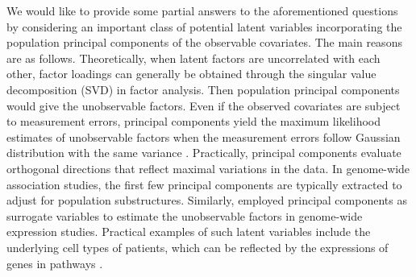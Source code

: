 \documentclass{statsoc}
\begin{document}

We would like to provide some partial answers to the aforementioned questions by considering an important class of potential latent variables incorporating the population principal components of the observable covariates. The main reasons are as follows. Theoretically, when latent factors are uncorrelated with each other, factor loadings can generally be obtained through the singular value decomposition (SVD) in factor analysis. Then population principal components would give the unobservable factors. Even if the observed covariates are subject to measurement errors, principal components yield the maximum likelihood estimates of unobservable factors when the measurement errors follow Gaussian distribution with the same variance \citep{Mardia1979}. Practically, principal components evaluate orthogonal directions that reflect maximal variations in the data. In genome-wide association studies, the first few principal components are typically extracted to adjust for population substructures. Similarly, \cite{Leek2007} employed principal components as surrogate variables to estimate the unobservable factors in genome-wide expression studies. Practical examples of such latent variables include the underlying cell types of patients, which can be reflected by the expressions of genes in pathways \citep{Bair2006}.
\end{document}
